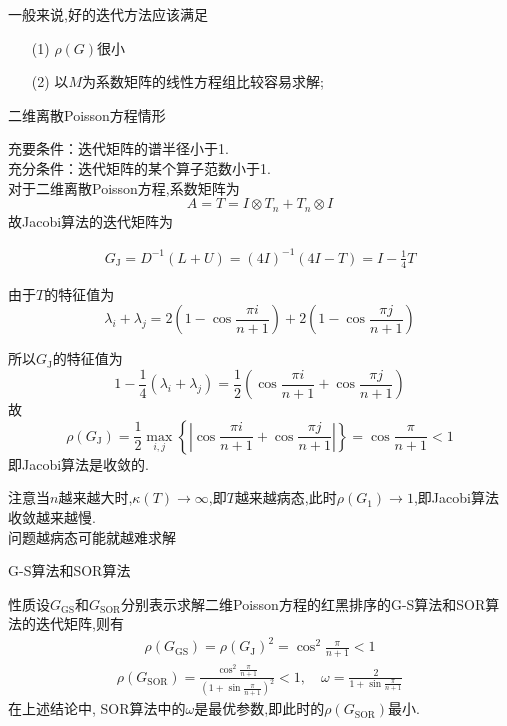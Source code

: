 \documentclass[notheorems,serif]{beamer}
\renewcommand{\normalsize}{\wuhao}
\newcommand{\wuhao}{\fontsize{10.5pt}{\baselineskip}\selectfont}
\begin{document}
一般来说,好的迭代方法应该满足
\begin{itemize}
\item[(1)]$\rho(G)$很小

\item[(2)]以$M$为系数矩阵的线性方程组比较容易求解;
\end{itemize}

\begin{frame}
{二维离散Poisson方程情形}


{\color{blue}充要条件}：迭代矩阵的谱半径小于1.\\
{\color{blue}充分条件}：迭代矩阵的某个算子范数小于1.\\
对于二维离散Poisson方程,系数矩阵为
$$
A=T=I \otimes T_{n}+T_{n} \otimes I
$$
故Jacobi算法的迭代矩阵为

\begin{align*}
G_{\mathrm{J}}=D^{-1}(L+U)=(4 I)^{-1}(4 I-T)=I-\frac{1}{4} T
\tag {6.12}
\end{align*}

由于$T$的特征值为
$$
\lambda_{i}+\lambda_{j}=2\left(1-\cos \frac{\pi i}{n+1}\right)+2\left(1-\cos \frac{\pi j}{n+1}\right)
$$
\end{frame}

\begin{frame}
所以$G_{\mathrm{J}}$的特征值为
$$
1-\frac{1}{4}\left(\lambda_{i}+\lambda_{j}\right)=\frac{1}{2}\left(\cos \frac{\pi i}{n+1}+\cos \frac{\pi j}{n+1}\right)
$$
故
$$
\rho\left(G_{\mathrm{J}}\right)=\frac{1}{2} \max _{i, j}\left\{\left|\cos \frac{\pi i}{n+1}+\cos \frac{\pi j}{n+1}\right|\right\}=\cos \frac{\pi}{n+1}<1
$$
即Jacobi算法是收敛的.

注意当$n$越来越大时,$\kappa(T) \rightarrow \infty$,即$T$越来越病态,此时$\rho\left(G_{1}\right) \rightarrow 1$,即Jacobi算法收敛越来越慢.\\
{\color{blue}问题越病态可能就越难求解}
\end{frame}

\begin{frame}


{\color{blue}\Large G-S算法和SOR算法}

\quad

\normalsize
{\color{blue}性质}设$G_{\mathrm{GS}}$和$G_{\mathrm{SOR}}$分别表示求解二维Poisson方程的红黑排序的G-S算法和SOR算法的迭代矩阵,则有
\begin{align*}
\rho\left(G_{\mathrm{GS}}\right)=\rho\left(G_{\mathrm{J}}\right)^{2}=\cos ^{2} \frac{\pi}{n+1}<1
\tag{6.13}
\end{align*}
\begin{align*}
\rho\left(G_{\mathrm{SOR}}\right)=\frac{\cos ^{2} \frac{\pi}{n+1}}{\left(1+\sin \frac{\pi}{n+1}\right)^{2}}<1, \quad \omega=\frac{2}{1+\sin \frac{\pi}{n+1}}
\tag{6.14}
\end{align*}
在上述结论中, SOR算法中的$\omega$是最优参数,即此时的$\rho\left(G_{\mathrm{SOR}}\right)$最小.
\end{frame}
\end{document}

